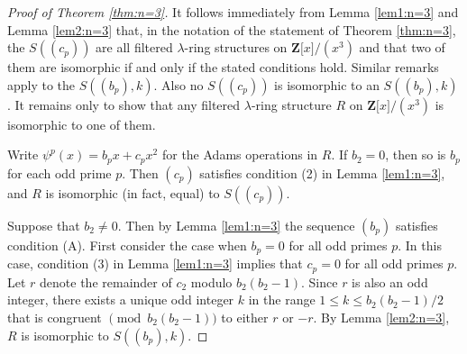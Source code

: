 \documentclass[reqno,11pt]{amsart}
\numberwithin{equation}{subsection}  %
\newcommand{\bZ}{\mathbf{Z}}
\begin{document}
\medskip
\begin{proof}[Proof of Theorem \ref{thm:n=3}]
It follows immediately from Lemma \ref{lem1:n=3} and Lemma \ref{lem2:n=3} that, in the notation of the statement of Theorem \ref{thm:n=3}, the $S((c_p))$ are all filtered $\lambda$-ring structures on $\bZ \lbrack x \rbrack/(x^3)$ and that two of them are isomorphic if and only if the stated conditions hold.  Similar remarks apply to the $S((b_p), k)$.  Also no $S((c_p))$ is isomorphic to an $S((b_p), k)$.  It remains only to show that any filtered $\lambda$-ring structure $R$ on $\bZ \lbrack x \rbrack/(x^3)$ is isomorphic to one of them.


Write $\psi^p(x) = b_p x + c_p x^2$ for the Adams operations in $R$.  If $b_2 = 0$, then so is $b_p$ for each odd prime $p$.  Then $(c_p)$ satisfies condition (2) in Lemma \ref{lem1:n=3}, and $R$ is isomorphic (in fact, equal) to $S((c_p))$.


Suppose that $b_2 \not= 0$.  Then by Lemma \ref{lem1:n=3} the sequence $(b_p)$ satisfies condition (A).  First consider the case when $b_p = 0$ for all odd primes $p$.  In this case, condition (3) in Lemma \ref{lem1:n=3} implies that $c_p = 0$ for all odd primes $p$.  Let $r$ denote the remainder of $c_2$ modulo $b_2(b_2 - 1)$.  Since $r$ is also an odd integer, there exists a unique odd integer $k$ in the range $1 \leq k \leq b_2(b_2 - 1)/2$ that is congruent $\pmod{b_2(b_2 - 1)}$ to either $r$ or $-r$.  By Lemma \ref{lem2:n=3}, $R$ is isomorphic to $S((b_p), k)$.



\end{proof}
\end{document}
